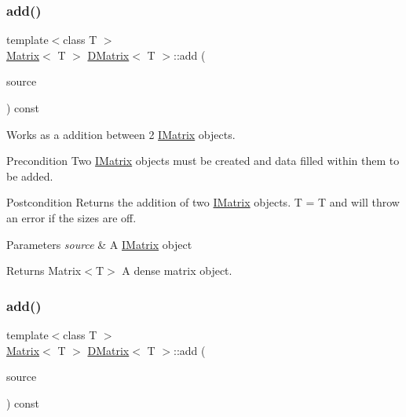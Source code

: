 \subsubsection{\texorpdfstring{add()}{add()}\hspace{0.1cm}{\footnotesize\ttfamily [2/6]}}
{\footnotesize\ttfamily template$<$class T $>$ \\
\mbox{\hyperlink{class_matrix}{Matrix}}$<$ T $>$ \mbox{\hyperlink{class_d_matrix}{D\+Matrix}}$<$ T $>$\+::add (\begin{DoxyParamCaption}\item[{const \mbox{\hyperlink{class_i_matrix}{I\+Matrix}}$<$ \mbox{\hyperlink{class_t_matrix}{T\+Matrix}}$<$ T $>$, T $>$ \&}]{source }\end{DoxyParamCaption}) const}



Works as a addition between 2 \mbox{\hyperlink{class_i_matrix}{I\+Matrix}} objects. 

\begin{DoxyPrecond}{Precondition}
Two \mbox{\hyperlink{class_i_matrix}{I\+Matrix}} objects must be created and data filled within them to be added. 
\end{DoxyPrecond}
\begin{DoxyPostcond}{Postcondition}
Returns the addition of two \mbox{\hyperlink{class_i_matrix}{I\+Matrix}} objects. T = T and will throw an error if the sizes are off.
\end{DoxyPostcond}

\begin{DoxyParams}{Parameters}
{\em source} & A \mbox{\hyperlink{class_i_matrix}{I\+Matrix}} object \\
\hline
\end{DoxyParams}
\begin{DoxyReturn}{Returns}
Matrix$<$\+T$>$ A dense matrix object. 
\end{DoxyReturn}
\mbox{\label{class_d_matrix_a77e3677fb5a94dd3b7012b7e7190d0ae}} 
\subsubsection{\texorpdfstring{add()}{add()}\hspace{0.1cm}{\footnotesize\ttfamily [3/6]}}
{\footnotesize\ttfamily template$<$class T $>$ \\
\mbox{\hyperlink{class_matrix}{Matrix}}$<$ T $>$ \mbox{\hyperlink{class_d_matrix}{D\+Matrix}}$<$ T $>$\+::add (\begin{DoxyParamCaption}\item[{const \mbox{\hyperlink{class_i_matrix}{I\+Matrix}}$<$ \mbox{\hyperlink{class_l_matrix}{L\+Matrix}}$<$ T $>$, T $>$ \&}]{source }\end{DoxyParamCaption}) const}



